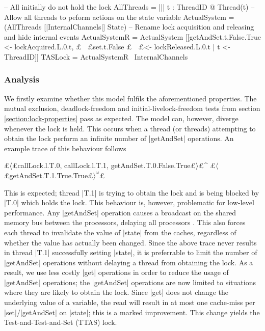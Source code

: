 
\begin{cspm}
  -- All initially do not hold the lock
  AllThreads = ||| t : ThreadID @ Thread(t)
  -- Allow all threads to peform actions on the state variable
  ActualSystem = (AllThreads [|InternalChannels|] State)
  -- Rename lock acquisition and releasing and hide internal events
  ActualSystemR = ActualSystem 
                    [[getAndSet.t.False.True <- lockAcquired.L.0.t, 
                     £$\!\!\:\:\!\!\:\!\:$£set.t.False            £$\!\!\:\:\!\!\:\!\;$£<- lockReleased.L.0.t  | t <- ThreadID]]
  TASLock = ActualSystemR \ InternalChannels
\end{cspm}

\subsubsection{Analysis}

We firstly examine whether this model fulfils the aforementioned properties. The mutual exclusion, deadlock-freedom and initial-livelock-freedom tests from section \ref{section:lock-properties} pass as expected. The model can, however, diverge whenever the lock is held. This occurs when a thread (or threads) attempting to obtain the lock perform an infinite number of |getAndSet| operations. An example trace of this behaviour follows
\begin{cspm}
  £$\langle$£callLock.l.T.0, callLock.l.T.1, getAndSet.T.0.False.True£$\rangle$£^
    £$\langle$£getAndSet.T.1.True.True£$\rangle^\omega$£
\end{cspm}
  
This is expected; thread |T.1| is trying to obtain the lock and is being blocked by |T.0| which holds the lock. This behaviour is, however, problematic for low-level performance. Any |getAndSet| operation causes a broadcast on the shared memory bus between the processors, delaying all processors \cite{TAoMP}. This also forces each thread to invalidate the value of |state| from the caches, regardless of whether the value has actually been changed. Since the above trace never results in thread |T.1| successfully setting |state|, it is preferrable to limit the number of |getAndSet| operations without delaying a thread from obtaining the lock. As a result, we use less costly |get| operations in order to reduce the usage of |getAndSet| operations; the |getAndSet| operations are now limited to situations where they are likely to obtain the lock. Since |get| does not change the underlying value of a variable, the read will result in at most one cache-miss per |set|/|getAndSet| on |state|; this is a marked improvement. This change yields the Test-and-Test-and-Set (TTAS) lock.%


